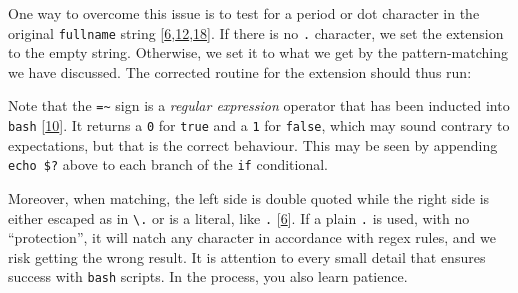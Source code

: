 \documentclass[
  a4paper,
]{article}
\newenvironment{Shaded}{\begin{snugshade}}{\end{snugshade}}
\newcommand{\AttributeTok}[1]{\textcolor[rgb]{0.80,0.80,0.80}{#1}}
\newcommand{\BuiltInTok}[1]{\textcolor[rgb]{0.80,0.80,0.80}{#1}}
\newcommand{\CommentTok}[1]{\textcolor[rgb]{0.50,0.62,0.50}{#1}}
\newcommand{\ControlFlowTok}[1]{\textcolor[rgb]{0.94,0.87,0.69}{#1}}
\newcommand{\DataTypeTok}[1]{\textcolor[rgb]{0.87,0.87,0.75}{#1}}
\newcommand{\KeywordTok}[1]{\textcolor[rgb]{0.94,0.87,0.69}{#1}}
\newcommand{\NormalTok}[1]{\textcolor[rgb]{0.80,0.80,0.80}{#1}}
\newcommand{\OperatorTok}[1]{\textcolor[rgb]{0.94,0.94,0.82}{#1}}
\newcommand{\OtherTok}[1]{\textcolor[rgb]{0.94,0.94,0.56}{#1}}
\newcommand{\PreprocessorTok}[1]{\textcolor[rgb]{1.00,0.81,0.69}{\textbf{#1}}}
\newcommand{\StringTok}[1]{\textcolor[rgb]{0.80,0.58,0.58}{#1}}
\newcommand{\VariableTok}[1]{\textcolor[rgb]{0.80,0.80,0.80}{#1}}
\begin{document}
One way to overcome this issue is to test for a period or dot character
in the original \texttt{fullname} string
{[}\protect\hyperlink{ref-dottest}{6},\protect\hyperlink{ref-periodtest}{12},\protect\hyperlink{ref-bashscriptpatmatch}{18}{]}.
If there is no \texttt{.} character, we set the extension to the empty
string. Otherwise, we set it to what we get by the pattern-matching we
have discussed. The corrected routine for the extension should thus run:

\begin{Shaded}
\end{Shaded}

Note that the \texttt{=\textasciitilde{}} sign is a \emph{regular
expression} operator that has been inducted into \texttt{bash}
{[}\protect\hyperlink{ref-equaltilde}{10}{]}. It returns a \texttt{0}
for \texttt{true} and a \texttt{1} for \texttt{false}, which may sound
contrary to expectations, but that is the correct behaviour. This may be
seen by appending \texttt{echo\ \$?} above to each branch of the
\texttt{if} conditional.

Moreover, when matching, the left side is double quoted while the right
side is either escaped as in \texttt{\textbackslash{}.} or is a literal,
like \texttt{\textquotesingle{}.\textquotesingle{}}
{[}\protect\hyperlink{ref-dottest}{6}{]}. If a plain \texttt{.} is used,
with no ``protection'', it will natch any character in accordance with
regex rules, and we risk getting the wrong result. It is attention to
every small detail that ensures success with \texttt{bash} scripts. In
the process, you also learn patience.  \normalfont
\end{document}
